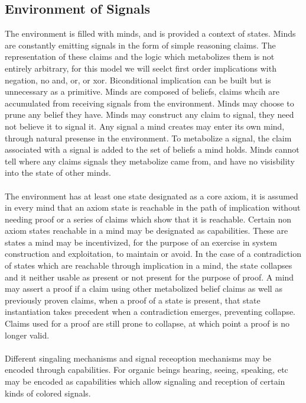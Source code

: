 \documentclass{article}
\begin{document}
	\subsection{Environment of Signals}
	The environment is filled with minds, and is provided a context of states. Minds are constantly emitting signals in the form of simple reasoning claims. The representation of these claims and the logic which metabolizes them is not entirely arbitrary, for this model we will seelct first order implications with negation, no and, or, or xor. Biconditional implication can be built but is unnecessary as a primitive. Minds are composed of beliefs, claims whcih are accumulated from receiving signals from the environment. Minds may choose to prune any belief they have. Minds may construct any claim to signal, they need not believe it to signal it. Any signal a mind creates may enter its own mind, through natural presense in the environment. To metabolize a signal, the claim associated with a signal is added to the set of beliefs a mind holds. Minds cannot tell where any claims signals they metabolize came from, and have no visisbility into the state of other minds.\\\\
	The environment has at least one state designated as a core axiom, it is assumed in every mind that an axiom state is reachable in the path of implication without needing proof or a series of claims which show that it is reachable. Certain non axiom states reachable in a mind may be designated as capabilities. These are states a mind may be incentivized, for the purpose of an exercise in system construction and exploitation, to maintain or avoid. In the case of a contradiction of states which are reachable through implication in a mind, the state collapses and it neither usable as present or not present for the purpose of proof. A mind may assert a proof if a claim using other metabolized belief claims as well as previously proven claims, when a proof of a state is present, that state instantiation takes precedent when a contradiction emerges, preventing collapse. Claims used for a proof are still prone to collapse, at which point a proof is no longer valid.\\\\
	Different singaling mechanisms and signal receoption mechanisms may be encoded through capabilities. For organic beings hearing, seeing, speaking, etc may be encoded as capabilities which allow signaling and reception of certain kinds of colored signals. 
\end{document}
